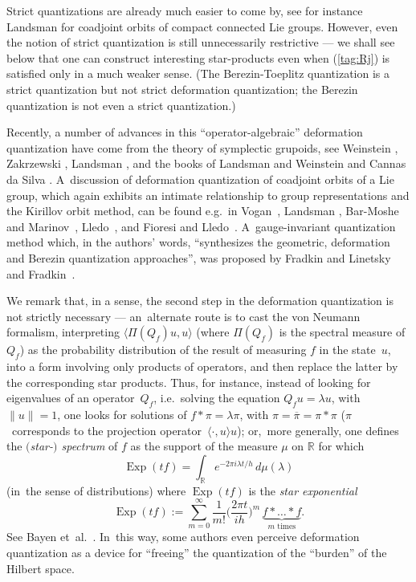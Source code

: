 \documentclass[11pt]{amsart}
\numberwithin{equation}{section}
\theoremstyle{remark}
\newcommand\spr[2]{\langle #1,#2\rangle}
\newcommand\RR{\mathbb R}
\begin{document}
Strict quantizations are already much easier to come by, see for instance
Landsman \cite{bib:LandsA} for coadjoint orbits of compact connected Lie
groups. However, even the notion of strict quantization is still unnecessarily
restrictive --- we shall see below that one can construct interesting
star-products even when (\ref{tag:Rj}) is satisfied only in a much weaker
sense. (The Berezin-Toeplitz quantization is a strict quantization but not
strict deformation quantization; the Berezin quantization is not even a strict
quantization.)

Recently, a number of advances in this ``operator-algebraic'' deformation
quantization %
have come from the theory of symplectic grupoids, see
Weinstein \cite{bib:WeinGrpd}, Zakrzewski \cite{bib:Zakr}, Landsman
\cite{bib:LandsO} \cite{bib:LandsJ}, and the books of Landsman
\cite{bib:LandsBk} and Weinstein and Cannas da Silva \cite{bib:CdSWei}.
A~discussion of deformation quantization of coadjoint orbits of a Lie group,
which again exhibits an intimate relationship to group representations and the
Kirillov orbit method, can be found e.g.~in Vogan~\cite{bib:Vogan}, Landsman
\cite{bib:LandsA}, Bar-Moshe and Marinov~\cite{bib:MarinA},
Lledo~\cite{bib:Lledo}, and Fioresi and Lledo~\cite{bib:FioL}.
A~gauge-invariant quantization method which, in the authors' words,
``synthesizes the geometric, deformation and Berezin quantization approaches'',
was proposed by Fradkin and Linetsky \cite{bib:FradLin} and
Fradkin~\cite{bib:Fradk}.

We remark that, in a sense, the second step in the deformation quantization is
not strictly necessary --- an~alternate route is to cast the von Neumann
formalism, interpreting $\spr{\Pi(Q_f)u}u$ (where $\Pi(Q_f)$ is the spectral
measure of~$Q_f$) as the probability distribution of the result of measuring
$f$ in the state~$u$, into a form involving only products of operators, and
then replace the latter by the corresponding star products. Thus, for instance,
instead of looking for eigenvalues of an operator~$Q_f$, i.e.~solving the
equation $Q_f u=\lambda u$, with $\|u\|=1$, one looks for solutions of $f*\pi=
\lambda\pi$, with $\pi=\overline\pi=\pi*\pi$ ($\pi$~corresponds to the
projection operator~$\spr\cdot u u$); or,~more generally, one defines the
{\sl $($star-$)$ spectrum\/} of $f$ as the support of the measure $\mu$ on
$\RR$ for which
$$ \operatorname{Exp}(tf) = \int_\RR e^{-2\pi i\lambda t/h} \,d\mu(\lambda)  $$
(in~the sense of distributions) where $\operatorname{Exp}(tf)$ is the {\sl star
exponential\/}
$$ \operatorname{Exp}(tf) := \sum_{m=0}^\infty \frac1{m!} \Big(\frac{2\pi
t}{ih}\Big)^m \,\underbrace{f*\dots*f}_{m\text{ times}} .  $$
See Bayen et~al.~\cite{bib:BFFLS}. In~this way, some authors even perceive
deformation quantization as a device for ``freeing'' the quantization of the
``burden'' of the Hilbert space.
\end{document}
